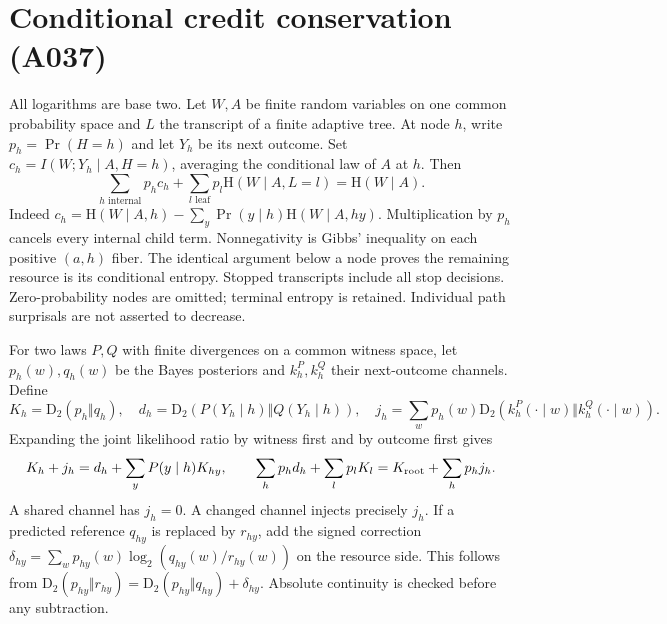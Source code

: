 \documentclass{article}
\newcommand{\HH}{\mathrm H}
\newcommand{\DD}{\mathrm D_2}
\begin{document}
\section*{Conditional credit conservation (A037)}
All logarithms are base two. Let $W,A$ be finite random variables on one
common probability space and $L$ the transcript of a finite adaptive tree.
At node $h$, write $p_h=\Pr(H=h)$ and let $Y_h$ be its next outcome.
Set $c_h=I(W;Y_h\mid A,H=h)$, averaging the conditional law of $A$ at $h$.
Then
\[
 \sum_{h\text{ internal}}p_h c_h+
 \sum_{l\text{ leaf}}p_l\HH(W\mid A,L=l)=\HH(W\mid A).
\]
Indeed $c_h=\HH(W\mid A,h)-\sum_y\Pr(y\mid h)\HH(W\mid A,hy)$.
Multiplication by $p_h$ cancels every internal child term. Nonnegativity
is Gibbs' inequality on each positive $(a,h)$ fiber. The identical argument
below a node proves the remaining resource is its conditional entropy.
Stopped transcripts include all stop decisions. Zero-probability nodes
are omitted; terminal entropy is retained. Individual path surprisals
are not asserted to decrease.

For two laws $P,Q$ with finite divergences on a common witness space, let
$p_h(w),q_h(w)$ be the Bayes posteriors and $k_h^P,k_h^Q$ their next-outcome
channels. Define
\[
 K_h=\DD(p_h\Vert q_h),\quad
 d_h=\DD(P(Y_h\mid h)\Vert Q(Y_h\mid h)),\quad
 j_h=\sum_w p_h(w)\DD(k_h^P(\cdot\mid w)\Vert k_h^Q(\cdot\mid w)).
\]
Expanding the joint likelihood ratio by witness first and by outcome first gives
\[
 K_h+j_h=d_h+\sum_yP(y\mid h)K_{hy},\qquad
 \sum_h p_h d_h+\sum_l p_lK_l=K_{\rm root}+\sum_h p_h j_h.
\]
A shared channel has $j_h=0$. A changed channel injects precisely $j_h$.
If a predicted reference $q_{hy}$ is replaced by $r_{hy}$, add the signed
correction $\delta_{hy}=\sum_w p_{hy}(w)\log_2(q_{hy}(w)/r_{hy}(w))$
on the resource side. This follows from
$\DD(p_{hy}\Vert r_{hy})=\DD(p_{hy}\Vert q_{hy})+\delta_{hy}$.
Absolute continuity is checked before any subtraction.
\end{document}
